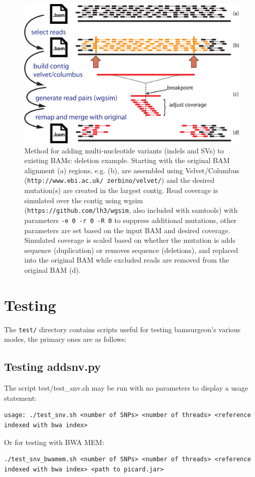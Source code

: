 \documentclass[letterpaper,11pt]{article}
\begin{document}
\newpage %

\begin{figure}[!h]
\centering
\includegraphics[width=5.5in]{bamsurgeon_sv_del.eps}
\caption{Method for adding multi-nucleotide variants (indels and SVs) to existing BAMs: deletion example. Starting with the original BAM alignment (a) regions, e.g. (b), are assembled using Velvet/Columbus (\texttt{http://www.ebi.ac.uk/~zerbino/velvet/}) and the desired mutation(s) are created in the largest contig. Read coverage is simulated over the contig using wgsim (\texttt{https://github.com/lh3/wgsim}, also included with samtools) with parameters \texttt{-e 0 -r 0 -R 0} to suppress additional mutations, other parameters are set based on the input BAM and desired coverage. Simulated coverage is scaled based on whether the mutation is adds sequence (duplication) or removes sequence (deletions), and replaced into the original BAM while excluded reads are removed from the original BAM (d).}
\end{figure}

\section{Testing}
The \texttt{test/} directory contains scripts useful for testing bamsurgeon's various modes, the primary ones are as follows:
\subsection{Testing addsnv.py}
The script {test/test\_snv.sh} may be run with no parameters to display a usage statement:
\begin{verbatim}
usage: ./test_snv.sh <number of SNPs> <number of threads> <reference indexed with bwa index>
\end{verbatim}
Or for testing with BWA MEM:
\begin{verbatim}
./test_snv_bwamem.sh <number of SNPs> <number of threads> <reference indexed with bwa index> <path to picard.jar>
\end{verbatim}
\end{document}
